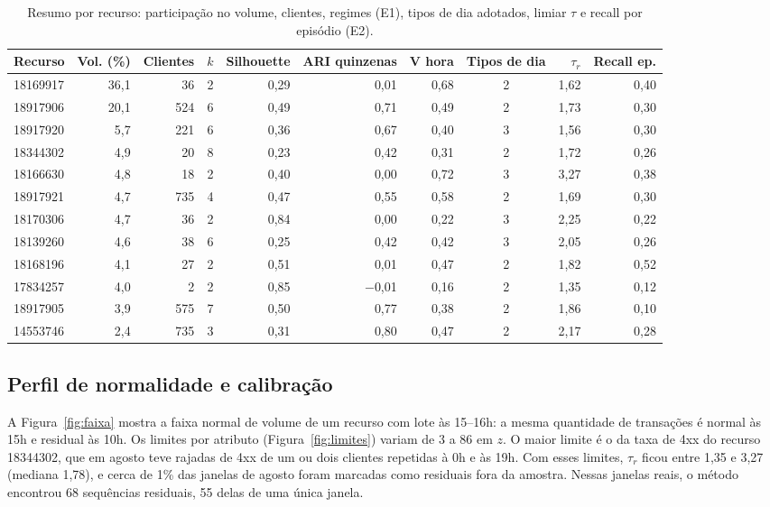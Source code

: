 \documentclass[sigconf,nonacm]{acmart}
\begin{document}
\begin{table}[t]
  \caption{Resumo por recurso: participação no volume, clientes, regimes (E1), tipos de dia adotados, limiar $\tau$ e recall por episódio (E2).}
  \label{tab:recursos}
  \small
  \begin{tabular}{lrrrrrrcrr}
    \toprule
    Recurso & Vol. (\%) & Clientes & $k$ & Silhouette & ARI quinzenas & V hora & Tipos de dia & $\tau_r$ & Recall ep. \\
    \midrule
    18169917 & 36,1 & 36  & 2 & 0,29 & 0,01  & 0,68 & 2 & 1,62 & 0,40 \\
    18917906 & 20,1 & 524 & 6 & 0,49 & 0,71  & 0,49 & 2 & 1,73 & 0,30 \\
    18917920 & 5,7  & 221 & 6 & 0,36 & 0,67  & 0,40 & 3 & 1,56 & 0,30 \\
    18344302 & 4,9  & 20  & 8 & 0,23 & 0,42  & 0,31 & 2 & 1,72 & 0,26 \\
    18166630 & 4,8  & 18  & 2 & 0,40 & 0,00  & 0,72 & 3 & 3,27 & 0,38 \\
    18917921 & 4,7  & 735 & 4 & 0,47 & 0,55  & 0,58 & 2 & 1,69 & 0,30 \\
    18170306 & 4,7  & 36  & 2 & 0,84 & 0,00  & 0,22 & 3 & 2,25 & 0,22 \\
    18139260 & 4,6  & 38  & 6 & 0,25 & 0,42  & 0,42 & 3 & 2,05 & 0,26 \\
    18168196 & 4,1  & 27  & 2 & 0,51 & 0,01  & 0,47 & 2 & 1,82 & 0,52 \\
    17834257 & 4,0  & 2   & 2 & 0,85 & $-$0,01 & 0,16 & 2 & 1,35 & 0,12 \\
    18917905 & 3,9  & 575 & 7 & 0,50 & 0,77  & 0,38 & 2 & 1,86 & 0,10 \\
    14553746 & 2,4  & 735 & 3 & 0,31 & 0,80  & 0,47 & 2 & 2,17 & 0,28 \\
    \bottomrule
  \end{tabular}
\end{table}

\subsection{Perfil de normalidade e calibração}
A Figura~\ref{fig:faixa} mostra a faixa normal de volume de um recurso com lote às 15--16h: a mesma quantidade de transações é normal às 15h e residual às 10h. Os limites por atributo (Figura~\ref{fig:limites}) variam de 3 a 86 em $z$. O maior limite é o da taxa de 4xx do recurso 18344302, que em agosto teve rajadas de 4xx de um ou dois clientes repetidas à 0h e às 19h. Com esses limites, $\tau_r$ ficou entre 1,35 e 3,27 (mediana 1,78), e cerca de 1\% das janelas de agosto foram marcadas como residuais fora da amostra. Nessas janelas reais, o método encontrou 68 sequências residuais, 55 delas de uma única janela.
\end{document}
